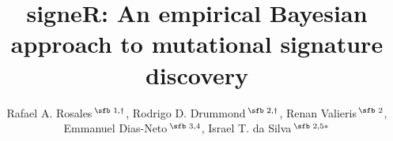\documentclass{bioinfo}
\begin{document}
\title[empirical Bayesian NMF]{signeR: An empirical Bayesian approach
  to mutational signature discovery}
\author[Rosales, R. A. and Drummond, R. D.~\textit{et~al}.]{
    Rafael A. Rosales\,$^{\text{\sfb 1,}\dagger}$, 
    Rodrigo D. Drummond\,$^{\text{\sfb 2,}\dagger}$, 
    Renan Valieris\,$^{\text{\sfb 2}}$,
    Emmanuel Dias-Neto\,$^{\text{\sfb 3,4}}$, 
    Israel T. da Silva\,$^{\text{\sfb 2,5}*}$}
\address{%
   $^{\text{\sf 1}}$Departamento de Computa\c{c}\~ao e
   Matem\'atica, Universidade de S\~ao Paulo, SP 14040-901, Brazil, 
   $^{\text{\sf 2}}$Laboratory of Bioinformatics and Computational 
   Biology, A. C. Camargo Cancer Center, SP  01509-010, 
   Brazil, $^{\text{\sf 3}}$Laboratory of Medical Genomics,
   A. C. Camargo Cancer Center, SP 01509-010, Brazil, $^{\text{\sf  4}}$Laboratory of Neurosciences (LIM27),
   Department and Institute of Psychiatry, Faculty of Medicine, University of S\~ao Paulo, SP 05403-903, Brazil,
   $^{\text{\sf 5}}$Laboratory of Molecular Immunology, The
   Rockefeller University, NY 10065, USA\\[1em]
   {\normalsize $^{\dagger}$The authors wish it to be known
   that, in their opinion, the first two authors should be regarded
   as joint First Authors} 
}
\end{document}
